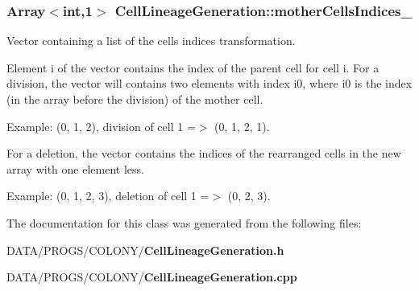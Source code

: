 \subsubsection{\setlength{\rightskip}{0pt plus 5cm}Array$<$int,1$>$ {\bf CellLineageGeneration::motherCellsIndices\_\-}}\label{classCellLineageGeneration_ea150bc5abc381a0a7df890ece98543f}


Vector containing a list of the cells indices transformation. 

Element i of the vector contains the index of the parent cell for cell i. For a division, the vector will contains two elements with index i0, where i0 is the index (in the array before the division) of the mother cell.

Example: (0, 1, 2), division of cell 1 =$>$ (0, 1, 2, 1).

For a deletion, the vector contains the indices of the rearranged cells in the new array with one element less.

Example: (0, 1, 2, 3), deletion of cell 1 =$>$ (0, 2, 3). 

The documentation for this class was generated from the following files:\begin{CompactItemize}
\item 
DATA/PROGS/COLONY/{\bf CellLineageGeneration.h}\item 
DATA/PROGS/COLONY/{\bf CellLineageGeneration.cpp}\end{CompactItemize}
